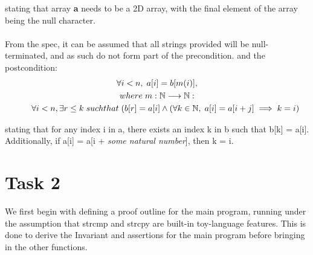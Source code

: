 \documentclass [a4paper, 12pt, fleqn]  {article}
\begin{document}
stating that array \textbf a needs to be a 2D array, with the final element of the array being the null character. 
\\~\\
From the spec, it can be assumed that all strings provided will be null-terminated, and as such do not form part of the precondition. 
\newpage
and the postcondition:
\begin{gather*}
  \forall i < n, \hspace{0.1cm} a[i] = b[m(i)], \\
  where \hspace{0.1cm} m: \mathbb{N} \longrightarrow \mathbb{N}: \\
   \hspace{0.7cm} \forall i < n, \exists r \leq k \hspace{0.1cm} such that \hspace{0.1cm} (b[r] = a[i] \wedge (\forall k \in \mathbb{N}, \hspace{0.1cm} a[i] = a[i+j] \implies k = i)
\end{gather*}

stating that for any index i in a, there exists an index k in b such that b[k] = a[i]. Additionally, if a[i] = a[i + \textit{some natural number}], then k = i.

\newpage
\section{Task 2}
\label{sec:task-2}
We first begin with defining a proof outline for the main program, running under the assumption that strcmp and strcpy are built-in toy-language features. This is done to derive the Invariant and assertions for the main program before bringing in the other functions.
\end{document}
